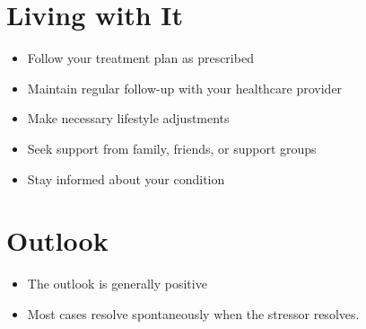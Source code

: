 \section{Living with It}
\begin{itemize}[noitemsep]
  \item Follow your treatment plan as prescribed
  \item Maintain regular follow-up with your healthcare provider
  \item Make necessary lifestyle adjustments
  \item Seek support from family, friends, or support groups
  \item Stay informed about your condition
\end{itemize}
\section{Outlook}
\begin{itemize}[noitemsep]
  \item The outlook is generally positive
  \item Most cases resolve spontaneously when the stressor resolves.
\end{itemize}
